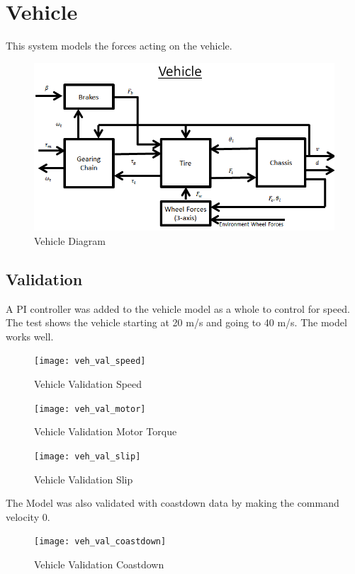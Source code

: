 \documentclass[../SimBALink.tex]{subfiles}
\begin{document}
\section{Vehicle} This system models the forces acting on the vehicle.
\begin{figure}[H]
  \centering
  \includegraphics[scale=.75]{Vehicle_Diagram}
  \caption{Vehicle Diagram}
\end{figure}






\subsection{Validation}
A PI controller was added to the vehicle model as a whole to control for speed. The test shows the vehicle starting at 20 m/s and going to 40 m/s. The model works well.

\begin{figure}[H]
  \centering
  \texttt{[image: veh\_val\_speed]}
  \caption{Vehicle Validation Speed}
\end{figure}

\begin{figure}[H]
  \centering
  \texttt{[image: veh\_val\_motor]}
  \caption{Vehicle Validation Motor Torque}
\end{figure}

\begin{figure}[H]
  \centering
  \texttt{[image: veh\_val\_slip]}
  \caption{Vehicle Validation Slip}
\end{figure}

The Model was also validated with coastdown data by making the command velocity 0.

\begin{figure}[H]
  \centering
  \texttt{[image: veh\_val\_coastdown]}
  \caption{Vehicle Validation Coastdown}
\end{figure}
\end{document}
